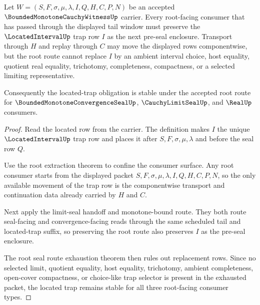 \begin{theorem}
\label{thm:bounded-monotone-cauchy-witness-root-located-trap-stability}
Let $W=(S,F,\sigma,\mu,\lambda,I,Q,H,C,P,N)$ be an accepted $\BoundedMonotoneCauchyWitnessUp$ carrier. Every root-facing consumer that has passed through the displayed tail window must preserve the $\LocatedIntervalUp$ trap row $I$ as the next pre-seal enclosure. Transport through $H$ and replay through $C$ may move the displayed rows componentwise, but the root route cannot replace $I$ by an ambient interval choice, host equality, quotient real equality, trichotomy, completeness, compactness, or a selected limiting representative.

Consequently the located-trap obligation is stable under the accepted root route for $\BoundedMonotoneConvergenceSealUp$, $\CauchyLimitSealUp$, and $\RealUp$ consumers.
\end{theorem}
\begin{proof}
Read the located row from the carrier. The definition makes $I$ the unique $\LocatedIntervalUp$ trap row and places it after $S,F,\sigma,\mu,\lambda$ and before the seal row $Q$.

Use the root extraction theorem to confine the consumer surface. Any root consumer starts from the displayed packet $S,F,\sigma,\mu,\lambda,I,Q,H,C,P,N$, so the only available movement of the trap row is the componentwise transport and continuation data already carried by $H$ and $C$.

Next apply the limit-seal handoff and monotone-bound route. They both route seal-facing and convergence-facing reads through the same scheduled tail and located-trap suffix, so preserving the root route also preserves $I$ as the pre-seal enclosure.

The root seal route exhaustion theorem then rules out replacement rows. Since no selected limit, quotient equality, host equality, trichotomy, ambient completeness, open-cover compactness, or choice-like trap selector is present in the exhausted packet, the located trap remains stable for all three root-facing consumer types.
\end{proof}

